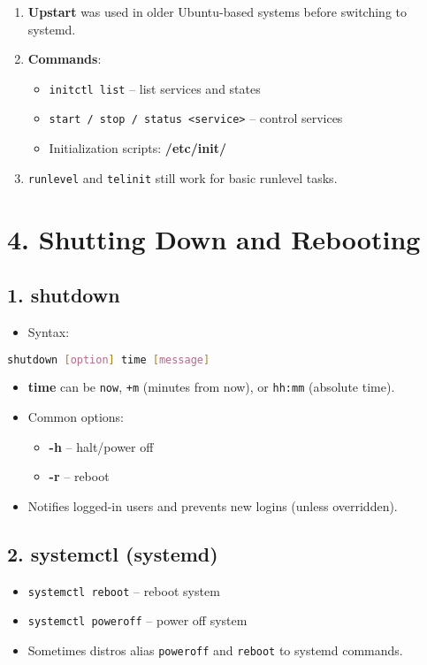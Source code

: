 \documentclass[12pt,a4paper]{report}
\begin{document}
\begin{enumerate}
    \item \textbf{Upstart} was used in older Ubuntu-based systems before switching to systemd.
    \item \textbf{Commands}:
    \begin{itemize}
        \item \texttt{initctl list} – list services and states
        \item \texttt{start / stop / status <service>} – control services
        \item Initialization scripts: \textbf{/etc/init/}
    \end{itemize}
    \item \texttt{runlevel} and \texttt{telinit} still work for basic runlevel tasks.
\end{enumerate}

\section*{4. Shutting Down and Rebooting}

\subsection*{1. shutdown}
\begin{itemize}
    \item Syntax:
\end{itemize}

\begin{lstlisting}[language=bash]
shutdown [option] time [message]
\end{lstlisting}

\begin{itemize}
    \item \textbf{time} can be \texttt{now}, \texttt{+m} (minutes from now), or \texttt{hh:mm} (absolute time).
    \item Common options:
    \begin{itemize}
        \item \textbf{-h} – halt/power off
        \item \textbf{-r} – reboot
    \end{itemize}
    \item Notifies logged-in users and prevents new logins (unless overridden).
\end{itemize}

\subsection*{2. systemctl (systemd)}
\begin{itemize}
    \item \texttt{systemctl reboot} – reboot system
    \item \texttt{systemctl poweroff} – power off system
    \item Sometimes distros alias \texttt{poweroff} and \texttt{reboot} to systemd commands.
\end{itemize}
\end{document}
